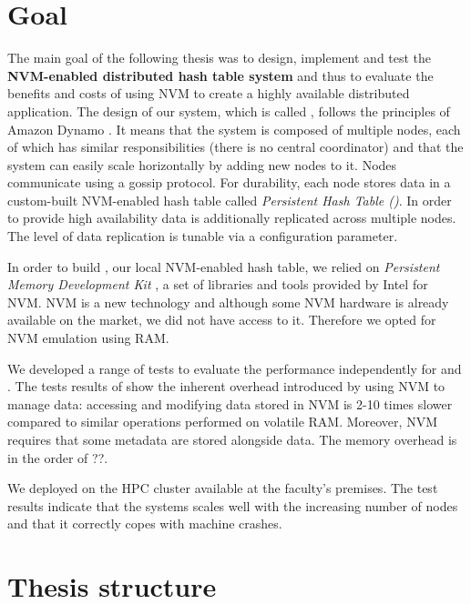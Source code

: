 \section{Goal}

The main goal of the following thesis was to design, implement and test the \textbf{NVM-enabled distributed hash table system} and thus to evaluate the benefits and costs of using NVM to create a highly available distributed application. 
The design of our system, which is called , follows the principles of Amazon Dynamo \cite{??}. It means that the system is composed of multiple nodes, each of which has similar responsibilities (there is no central coordinator) and that the system can easily scale horizontally by adding new nodes to it. Nodes communicate using a gossip protocol. For durability, each node stores data in a custom-built NVM-enabled hash table called \emph{Persistent Hash Table (\PHT)}. In order to provide high availability data is additionally replicated across multiple nodes. The level of data replication is tunable via a configuration parameter.

In order to build \PHT, our local NVM-enabled hash table, we relied on \emph{Persistent Memory Development Kit} \cite{PmemIo}, a set of libraries and tools provided by Intel for NVM. NVM is a new technology and although some NVM hardware is already available on the market, we did not have access to it. Therefore we opted for NVM emulation using RAM.

We developed a range of tests to evaluate the performance independently for \PHT and . The tests results of \PHT show the inherent overhead introduced by using NVM to manage data: accessing and modifying data stored in NVM is 2-10 times slower compared to similar operations performed on volatile RAM. Moreover, NVM requires that some metadata are stored alongside data. The memory overhead is in the order of ??. 

We deployed  on the HPC cluster available at the faculty's premises. The test results indicate that the systems scales well with the increasing number of nodes and that it correctly copes with machine crashes.

\section{Thesis structure}

